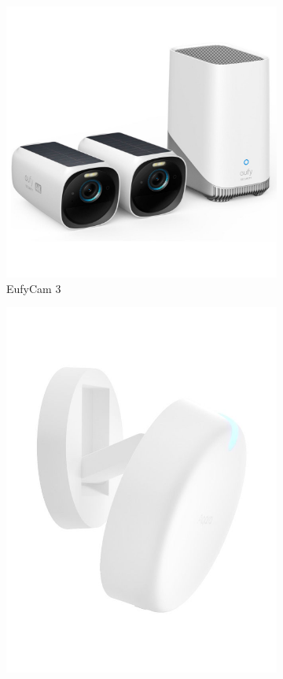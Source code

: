 \begin{figure}[H]
    \centering
    \begin{subfigure}{0.3\textwidth}
        \centering
        \includegraphics[width=\textwidth]{Images/Products/eufycam3.jpg}
        \caption{EufyCam 3}
        \label{fig:eufycam_3}
    \end{subfigure}
    \hfill
    \begin{subfigure}{0.3\textwidth}
        \centering
        \includegraphics[width=\textwidth]{Images/Products/aquara_fp2.jpg}

\end{subfigure}
\end{figure}
